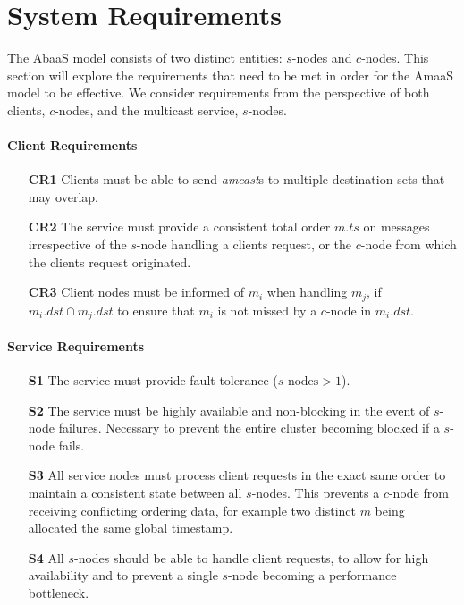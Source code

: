 \section{System Requirements}\label{sec:absaas_requirements}
The \textsf{AbaaS} model consists of two distinct entities: $s$-nodes and $c$-nodes.  This section will explore the requirements that need to be met in order for the \textsf{AmaaS} model to be effective.  We consider requirements from the perspective of both clients, $c$-nodes, and the multicast service, $s$-nodes.

	\paragraph{Client Requirements} \hspace{0pt}
	\begin{itemize}
		\item [\textbf{CR1}] Clients must be able to send \emph{amcast}s to multiple destination sets that may overlap.
		
		\item [\textbf{CR2}] The service must provide a consistent total order $m.ts$ on messages irrespective of the $s$-node handling a clients request, or the $c$-node from which the clients request originated.  
		
		\item [\textbf{CR3}] Client nodes must be informed of $m_i$ when handling $m_j$, if $m_i.dst \cap m_j.dst$ to ensure that $m_i$ is not missed by a $c$-node in $m_i.dst$.  
	\end{itemize}
	
	\paragraph{Service Requirements} \hspace{0pt}
	\begin{itemize}
		\item [\textbf{S1}] The service must provide fault-tolerance ($s\text{-nodes} > 1$).
		
		\item [\textbf{S2}] The service must be highly available and non-blocking in the event of $s$-node failures.  Necessary to prevent the entire cluster becoming blocked if a $s$-node fails.   
		
		\item [\textbf{S3}] All service nodes must process client requests in the exact same order to maintain a consistent state between all $s$-nodes.  This prevents a $c$-node from receiving conflicting ordering data, for example two distinct $m$ being allocated the same global timestamp.  
		
		\item [\textbf{S4}] All $s$-nodes should be able to handle client requests, to allow for high availability and to prevent a single $s$-node becoming a performance bottleneck.
	\end{itemize}

